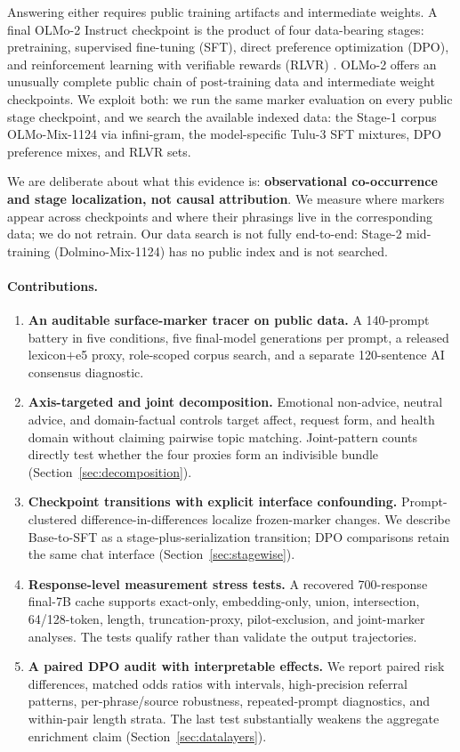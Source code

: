 \documentclass[11pt]{article}
\begin{document}
Answering either requires public training artifacts and intermediate weights. A final
OLMo-2 Instruct checkpoint is the product of four data-bearing stages:
pretraining, supervised fine-tuning (SFT), direct preference optimization
(DPO), and reinforcement learning with verifiable rewards (RLVR)
\citep{olmo2025olmo2}. OLMo-2 offers an unusually complete public chain of
post-training data and intermediate weight checkpoints. We exploit both: we run the same marker evaluation
on every public stage checkpoint, and we search the available indexed data:
the Stage-1 corpus OLMo-Mix-1124 via infini-gram, the model-specific Tulu-3
SFT mixtures, DPO preference mixes, and RLVR sets.

We are deliberate about what this evidence is: \textbf{observational
co-occurrence and stage localization, not causal attribution}. We measure
where markers appear across checkpoints and where their phrasings live in
the corresponding data; we do not retrain. Our data search is not fully
end-to-end: Stage-2 mid-training (Dolmino-Mix-1124) has no public index and is
not searched.

\paragraph{Contributions.}
\begin{enumerate}\itemsep2pt
\item \textbf{An auditable surface-marker tracer on public data.} A 140-prompt
battery in five conditions, five final-model generations per prompt, a released
lexicon$+$e5 proxy, role-scoped corpus search, and a separate 120-sentence AI
consensus diagnostic.
\item \textbf{Axis-targeted and joint decomposition.} Emotional non-advice,
neutral advice, and domain-factual controls target affect, request form, and
health domain without claiming pairwise topic matching. Joint-pattern counts
directly test whether the four proxies form an indivisible bundle
(Section~\ref{sec:decomposition}).
\item \textbf{Checkpoint transitions with explicit interface confounding.}
Prompt-clustered difference-in-differences localize frozen-marker changes. We
describe Base-to-SFT as a stage-plus-serialization transition; DPO comparisons
retain the same chat interface (Section~\ref{sec:stagewise}).
\item \textbf{Response-level measurement stress tests.} A recovered 700-response
final-7B cache supports exact-only, embedding-only, union, intersection,
64/128-token, length, truncation-proxy, pilot-exclusion, and joint-marker
analyses. The tests qualify rather than validate the output trajectories.
\item \textbf{A paired DPO audit with interpretable effects.} We report paired
risk differences, matched odds ratios with intervals, high-precision referral
patterns, per-phrase/source robustness, repeated-prompt diagnostics, and
within-pair length strata. The last test substantially weakens the aggregate
enrichment claim (Section~\ref{sec:datalayers}).
\end{enumerate}
\end{document}
